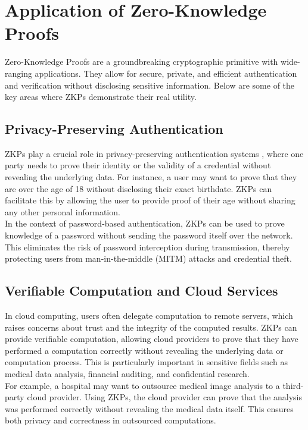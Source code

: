 \section{Application of Zero-Knowledge Proofs}
\justify
Zero-Knowledge Proofs are a groundbreaking cryptographic primitive with wide-ranging applications.\cite{chainlink2024} They allow for secure, private, and efficient authentication and verification without disclosing sensitive information. Below are some of the key areas where ZKPs demonstrate their real utility.

\subsection{Privacy-Preserving Authentication}

ZKPs play a crucial role in privacy-preserving authentication systems \cite{bhattacharya2024}, where one party needs to prove their identity or the validity of a credential without revealing the underlying data. For instance, a user may want to prove that they are over the age of 18 without disclosing their exact birthdate. ZKPs can facilitate this by allowing the user to provide proof of their age without sharing any other personal information.
\\
In the context of password-based authentication, ZKPs can be used to prove knowledge of a password without sending the password itself over the network. This eliminates the risk of password interception during transmission, thereby protecting users from man-in-the-middle (MITM) attacks and credential theft.

\subsection{Verifiable Computation and Cloud Services}

In cloud computing, users often delegate computation to remote servers, which raises concerns about trust and the integrity of the computed results. ZKPs can provide verifiable computation, allowing cloud providers to prove that they have performed a computation correctly without revealing the underlying data or computation process. This is particularly important in sensitive fields such as medical data analysis, financial auditing, and confidential research.
\\
For example, a hospital may want to outsource medical image analysis to a third-party cloud provider. Using ZKPs, the cloud provider can prove that the analysis was performed correctly without revealing the medical data itself. This ensures both privacy and correctness in outsourced computations.

